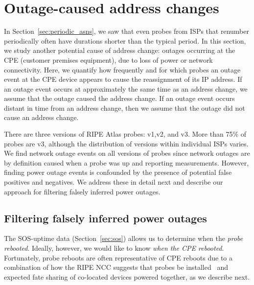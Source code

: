 
\section{Outage-caused address changes}
\label{sec:outages}

In Section~\ref{sec:periodic_asns}, we saw that even probes from ISPs
that renumber periodically
often have durations shorter than the typical period. In this section,
we study another potential cause of address change: outages occurring
at the CPE (customer premises equipment), due to loss of power or network connectivity. Here, we quantify how frequently and for which probes an
outage event at the CPE device appears to
cause the reassignment of its IP address. If an outage event occurs
at approximately the same time as an address change, we assume that the
outage caused the address change. If an outage event occurs
distant in time from an address change, then we assume that the outage
did not cause an address change. 

There are three versions of RIPE Atlas probes: v1,v2, and v3. More
than 75\% of probes are v3, although the distribution of versions within
individual ISPs varies. We find network outage events
on all versions of probes since network outages are by definition caused when a
probe was up and reporting measurements.
However, finding power outage
events is confounded by the presence of potential false positives and
negatives. We address these in detail next and describe our approach
for filtering falsely inferred power outages.

\subsection{Filtering falsely inferred power outages}

The SOS-uptime data (Section~\ref{sec:sos}) allows us to
determine when the \emph{probe rebooted}. Ideally, however, we would like to know
\emph{when the CPE rebooted}.  Fortunately, probe
reboots are often representative of CPE reboots due to a
combination of how the RIPE NCC suggests that probes be
installed~\cite{cpepowersprobe} and expected fate sharing of co-located
devices powered together, as we describe next.  

